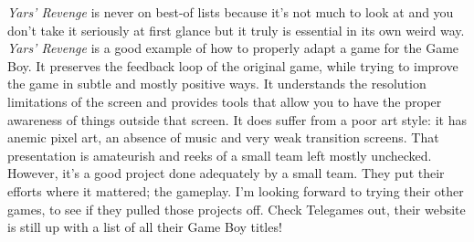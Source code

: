 \documentclass{book}
\begin{document}
\emph{Yars’ Revenge} is never on best-of lists because it’s not much to look at and you don’t take it seriously at first glance but it truly is essential in its own weird way. \emph{Yars’ Revenge} is a good example of how to properly adapt a game for the Game Boy. It preserves the feedback loop of the original game, while trying to improve the game in subtle and mostly positive ways. It understands the resolution limitations of the screen and provides tools that allow you to have the proper awareness of things outside that screen. It does suffer from a poor art style: it has anemic pixel art, an absence of music and very weak transition screens. That presentation is amateurish and reeks of a small team left mostly unchecked. However, it’s a good project done adequately by a small team. They put their efforts where it mattered; the gameplay. I’m looking forward to trying their other games, to see if they pulled those projects off. Check Telegames out, their website is still up with a list of all their Game Boy titles!\par
\end{document}
